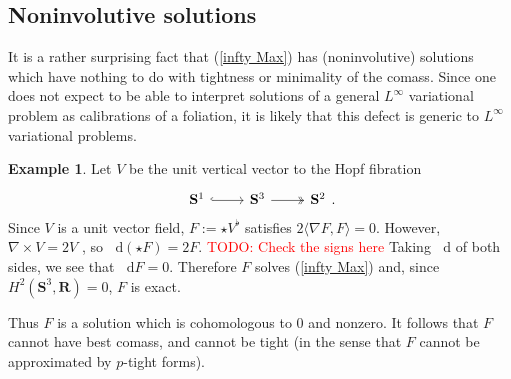 \documentclass[reqno,11pt]{amsart}
\newcommand{\RR}{\mathbf{R}}
\newcommand{\Hyp}{\mathbf H}
\newcommand{\Sph}{\mathbf S}
\newcommand*\dif{\mathop{}\!\mathrm{d}}
\theoremstyle{definition}
\newtheorem{example}[theorem]{Example}
\numberwithin{equation}{section}
\newcommand\todo[1]{\textcolor{red}{TODO: #1}}
\begin{document}



\subsection{Noninvolutive solutions}
It is a rather surprising fact that (\ref{infty Max}) has (noninvolutive) solutions which have nothing to do with tightness or minimality of the comass.
Since one does not expect to be able to interpret solutions of a general $L^\infty$ variational problem as calibrations of a foliation, it is likely that this defect is generic to $L^\infty$ variational problems.

\begin{example}\label{integrability needed}
Let $V$ be the unit vertical vector to the Hopf fibration%
\[\begin{tikzcd}
	{\mathbf S^1} & {\mathbf S^3} & {\mathbf S^2}
	\arrow[hook, from=1-1, to=1-2]
	\arrow[two heads, from=1-2, to=1-3]
\end{tikzcd}.\]
Since $V$ is a unit vector field, $F := \star V^\flat$ satisfies $2\langle \nabla F, F\rangle = 0$.
However, $\nabla \times V = 2V$ \cite[\S3]{Peralta_Salas_2023}, so $\dif(\star F) = 2F$.
\todo{Check the signs here}
Taking $\dif$ of both sides, we see that $\dif F = 0$.
Therefore $F$ solves (\ref{infty Max}) and, since $H^2(\Sph^3, \RR) = 0$, $F$ is exact.

Thus $F$ is a solution which is cohomologous to $0$ and nonzero.
It follows that $F$ cannot have best comass, and cannot be tight (in the sense that $F$ cannot be approximated by $p$-tight forms).
\end{example}
\end{document}
